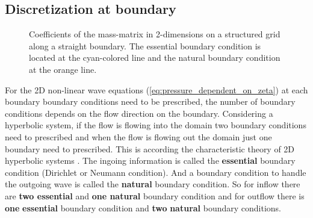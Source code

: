 \subsection{Discretization at boundary}
\begin{figure}[H]
    \begin{center}
        \def\svgwidth{0.80\textwidth} %
        \resizebox{0.65\textwidth}{!}{
            
        }
    \end{center}
    \caption[Definition of the grid to solve the 2D-shallow water equations at the boundary]{Coefficients of the mass-matrix in 2-dimensions on a structured grid along a straight boundary. The essential boundary condition is located at the cyan-colored line and the natural boundary condition at the orange line.}
    \label{fig:structured_grid_along_straight_boundary}
\end{figure}
For the 2D non-linear wave equations (\autoref{eq:pressure_dependent_on_zeta}) at each boundary boundary conditions need to be prescribed, the number of boundary conditions depends on the flow direction on the boundary.
Considering a hyperbolic system, if the flow is flowing into the domain two boundary conditions need to prescribed and when the flow is flowing out the domain just one boundary need to prescribed.
This is according the characteristic theory of 2D hyperbolic systems \citep{DaubertEtGraffe1967}.
The ingoing information is called the \textbf{essential} boundary condition (Dirichlet or Neumann condition).
And a boundary condition to handle the outgoing wave is called the \textbf{natural} boundary condition.
So for inflow there are \textbf{two essential} and \textbf{one natural} boundary condition and for outflow there is \textbf{one} \textbf{essential} boundary condition and \textbf{two} \textbf{natural} boundary conditions.

